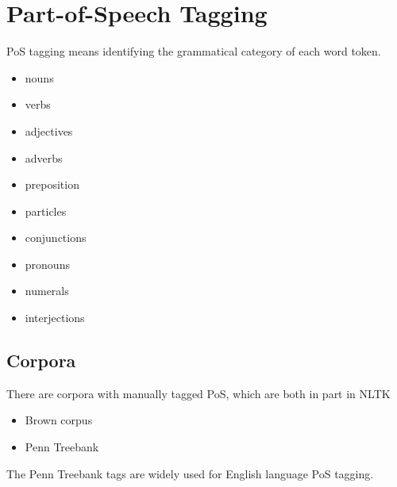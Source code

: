 \documentclass[11pt]{article}
\begin{document}
\section{Part-of-Speech Tagging}
PoS tagging means identifying the grammatical category of each word token.

\vspace{1em}
\noindent
\begin{minipage}{0.5\linewidth}
	\begin{itemize}
		\item nouns
		\item verbs
		\item adjectives
		\item adverbs
		\item preposition
	\end{itemize}
\end{minipage}
\begin{minipage}{0.5\linewidth}
	\begin{itemize}
		\item particles
		\item conjunctions
		\item pronouns
		\item numerals
		\item interjections
	\end{itemize}
\end{minipage}

\subsection{Corpora}
There are corpora with manually tagged PoS, which are both in part in NLTK
\begin{itemize}
	\item Brown corpus
	\item Penn Treebank
\end{itemize}
The Penn Treebank tags are widely used for English language PoS tagging.
\end{document}
